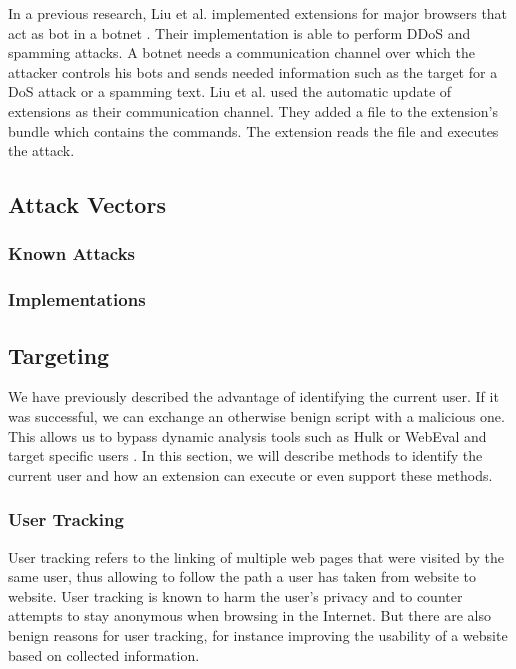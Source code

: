 		In a previous research, Liu et al. implemented extensions for major browsers that act as bot in a botnet \cite{liu2011botnet}. Their implementation is able to perform DDoS and spamming attacks. A botnet needs a communication channel over which the attacker controls his bots and sends needed information such as the target for a DoS attack or a spamming text. Liu et al. used the automatic update of extensions as their communication channel. They added a file to the extension's bundle which contains the commands. The extension reads the file and executes the attack.  
	
	\subsection{Attack Vectors}
		
		\subsubsection{Known Attacks}
			
			
			
		\subsubsection{Implementations}
		
			
		
	\subsection{Targeting}
	
		We have previously described the advantage of identifying the current user. If it was successful, we can exchange an otherwise benign script with a malicious one. This allows us to bypass dynamic analysis tools such as Hulk or WebEval and target specific users \cite{184485, 190984}. In this section, we will describe methods to identify the current user and how an extension can execute or even support these methods. 
		
		\subsubsection{User Tracking}
	
			User tracking refers to the linking of multiple web pages that were visited by the same user, thus allowing to follow the path a user has taken from website to website. User tracking is known to harm the user's privacy and to counter attempts to stay anonymous when browsing in the Internet. %
			But there are also benign reasons for user tracking, for instance improving the usability of a website based on collected information. \\ 
			
